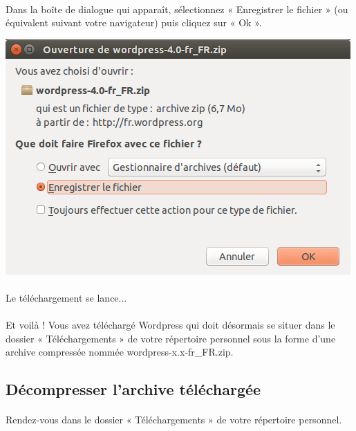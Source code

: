 \documentclass[10pt,a4paper]{article}
\begin{document}
\paragraph{}Dans la boîte de dialogue qui apparaît, sélectionnez « Enregistrer le fichier » (ou équivalent suivant votre navigateur) puis cliquez sur « Ok ».
\begin{center}
\includegraphics[scale=0.5]{img/0003.png}
\end{center}
\paragraph{}Le téléchargement se lance...
\paragraph{}Et voilà ! Vous avez téléchargé Wordpress qui doit désormais se situer dans le dossier « Téléchargements » de votre répertoire personnel sous la forme d'une archive compressée nommée wordpress-x.x-fr\_FR.zip.
\subsection{Décompresser l'archive téléchargée}
\paragraph{}Rendez-vous dans le dossier « Téléchargements » de votre répertoire personnel.
\end{document}
